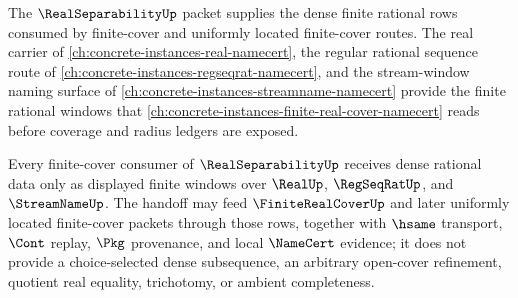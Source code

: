 The $\RealSeparabilityUp$ packet supplies the dense finite rational rows consumed by finite-cover and uniformly located finite-cover routes. The real carrier of \autoref{ch:concrete-instances-real-namecert}, the regular rational sequence route of \autoref{ch:concrete-instances-regseqrat-namecert}, and the stream-window naming surface of \autoref{ch:concrete-instances-streamname-namecert} provide the finite rational windows that \autoref{ch:concrete-instances-finite-real-cover-namecert} reads before coverage and radius ledgers are exposed.

\begin{proposition}
\label{prop:real-separability-finite-cover-forward-link}
Every finite-cover consumer of $\RealSeparabilityUp$ receives dense rational data only as displayed finite windows over $\RealUp$, $\RegSeqRatUp$, and $\StreamNameUp$. The handoff may feed $\FiniteRealCoverUp$ and later uniformly located finite-cover packets through those rows, together with $\hsame$ transport, $\Cont$ replay, $\Pkg$ provenance, and local $\NameCert$ evidence; it does not provide a choice-selected dense subsequence, an arbitrary open-cover refinement, quotient real equality, trichotomy, or ambient completeness.
\end{proposition}
